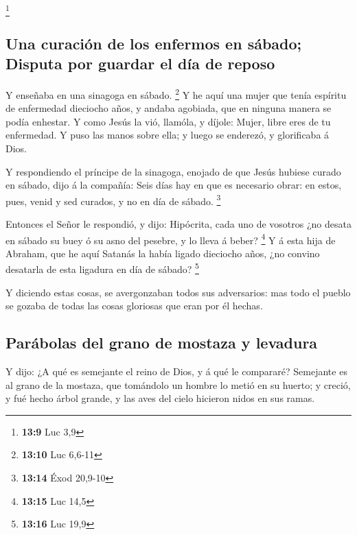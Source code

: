 \footnote{\textbf{13:9} Luc 3,9}

\hypertarget{una-curaciuxf3n-de-los-enfermos-en-suxe1bado-disputa-por-guardar-el-duxeda-de-reposo}{%
\subsection{Una curación de los enfermos en sábado; Disputa por guardar
el día de
reposo}\label{una-curaciuxf3n-de-los-enfermos-en-suxe1bado-disputa-por-guardar-el-duxeda-de-reposo}}

 Y enseñaba en una sinagoga en sábado. \footnote{\textbf{13:10}
  Luc 6,6-11}  Y he aquí una mujer que tenía espíritu de
enfermedad dieciocho años, y andaba agobiada, que en ninguna manera se
podía enhestar.  Y como Jesús la vió, llamóla, y díjole:
Mujer, libre eres de tu enfermedad.  Y puso las manos
sobre ella; y luego se enderezó, y glorificaba á Dios.

 Y respondiendo el príncipe de la sinagoga, enojado de
que Jesús hubiese curado en sábado, dijo á la compañía: Seis días hay en
que es necesario obrar: en estos, pues, venid y sed curados, y no en día
de sábado. \footnote{\textbf{13:14} Éxod 20,9-10}

 Entonces el Señor le respondió, y dijo: Hipócrita, cada
uno de vosotros ¿no desata en sábado su buey ó su asno del pesebre, y lo
lleva á beber? \footnote{\textbf{13:15} Luc 14,5}  Y á
esta hija de Abraham, que he aquí Satanás la había ligado dieciocho
años, ¿no convino desatarla de esta ligadura en día de sábado?
\footnote{\textbf{13:16} Luc 19,9}

 Y diciendo estas cosas, se avergonzaban todos sus
adversarios: mas todo el pueblo se gozaba de todas las cosas gloriosas
que eran por él hechas.

\hypertarget{paruxe1bolas-del-grano-de-mostaza-y-levadura}{%
\subsection{Parábolas del grano de mostaza y
levadura}\label{paruxe1bolas-del-grano-de-mostaza-y-levadura}}

 Y dijo: ¿A qué es semejante el reino de Dios, y á qué le
compararé?  Semejante es al grano de la mostaza, que
tomándolo un hombre lo metió en su huerto; y creció, y fué hecho árbol
grande, y las aves del cielo hicieron nidos en sus ramas.

